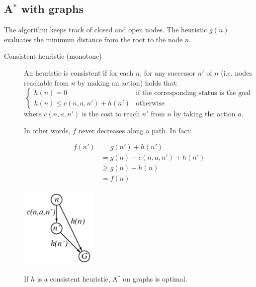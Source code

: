 \subsection{A$^\textbf{*}$ with graphs}
The algorithm keeps track of closed and open nodes.
The heuristic $g(n)$ evaluates the minimum distance from the root to the node $n$.

\begin{description}
    \item[Consistent heuristic (monotone)] 
    An heuristic is consistent if for each $n$, for any successor $n'$ of $n$ (i.e. nodes reachable from $n$ by making an action)
    holds that:
    \[ 
        \begin{cases}
            h(n) = 0 & \text{if the corresponding status is the goal} \\
            h(n) \leq c(n, a, n') + h(n') & \text{otherwise}
        \end{cases}
    \]
    where $c(n, a, n')$ is the cost to reach $n'$ from $n$ by taking the action $a$.

    In other words, $f$ never decreases along a path.
    In fact:\\
    \begin{minipage}{.48\linewidth}
        \[  
            \begin{split}
                f(n') &= g(n') + h(n') \\
                    &= g(n) + c(n, a, n') + h(n') \\
                    &\geq g(n) + h(n) \\
                    &= f(n)
            \end{split}
        \]
    \end{minipage}
    \begin{minipage}{.48\linewidth}
        \centering
        \includegraphics[width=0.3\textwidth]{img/monotone_heuristic.png}
    \end{minipage}


    \begin{theorem}
        If $h$ is a consistent heuristic, A$^*$ on graphs is optimal.
    \end{theorem}
\end{description}
